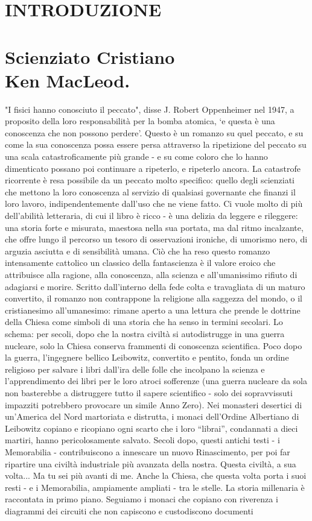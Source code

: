 { \chapter*{INTRODUZIONE}}
{ \chapter*{Scienziato Cristiano\\{\footnotesize Ken MacLeod.}}}
"I fisici hanno conosciuto il peccato", disse J. Robert Oppenheimer nel 1947, a proposito della loro responsabilità per la bomba atomica, ‘e questa è una conoscenza che non possono perdere’. Questo è un romanzo su quel peccato, e su come la sua conoscenza possa essere persa attraverso la ripetizione del peccato su una scala catastroficamente più grande - e su come coloro che lo hanno dimenticato possano poi continuare a ripeterlo, e ripeterlo ancora. La catastrofe ricorrente è resa possibile da un peccato molto specifico: quello degli scienziati che mettono la loro conoscenza al servizio di qualsiasi governante che finanzi il loro lavoro, indipendentemente dall'uso che ne viene fatto. Ci vuole molto di più dell'abilità letteraria, di cui il libro è ricco - è una delizia da leggere e rileggere: una storia forte e misurata, maestosa nella sua portata, ma dal ritmo incalzante, che offre lungo il percorso un tesoro di osservazioni ironiche, di umorismo nero, di arguzia asciutta e di sensibilità umana. Ciò che ha reso questo romanzo intensamente cattolico un classico della fantascienza è il valore eroico che attribuisce alla ragione, alla conoscenza, alla scienza e all'umanissimo rifiuto di adagiarsi e morire. Scritto dall'interno della fede colta e travagliata di un maturo convertito, il romanzo non contrappone la religione alla saggezza del mondo, o il cristianesimo all'umanesimo: rimane aperto a una lettura che prende le dottrine della Chiesa come simboli di una storia che ha senso in termini secolari. Lo schema: per secoli, dopo che la nostra civiltà si autodistrugge in una guerra nucleare, solo la Chiesa conserva frammenti di conoscenza scientifica. Poco dopo la guerra, l'ingegnere bellico Leibowitz, convertito e pentito, fonda un ordine religioso per salvare i libri dall'ira delle folle che incolpano la scienza e l'apprendimento dei libri per le loro atroci sofferenze (una guerra nucleare da sola non basterebbe a distruggere tutto il sapere scientifico - solo dei sopravvissuti impazziti potrebbero provocare un simile Anno Zero). Nei monasteri desertici di un'America del Nord martoriata e distrutta, i monaci dell'Ordine Albertiano di Leibowitz copiano e ricopiano ogni scarto che i loro “librai”, condannati a dieci martiri, hanno pericolosamente salvato. Secoli dopo, questi antichi testi - i Memorabilia - contribuiscono a innescare un nuovo Rinascimento, per poi far ripartire una civiltà industriale più avanzata della nostra. Questa civiltà, a sua volta... Ma tu sei più avanti di me. Anche la Chiesa, che questa volta porta i suoi resti - e i Memorabilia, ampiamente ampliati - tra le stelle. La storia millenaria è raccontata in primo piano. Seguiamo i monaci che copiano con riverenza i diagrammi dei circuiti che non capiscono e custodiscono documenti 